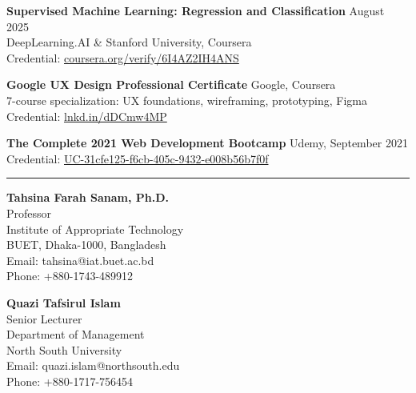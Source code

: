 \documentclass[11pt,a4paper]{article}
\renewcommand{\section}[1]{%
    \par\vspace{10pt}%
    \pagebreak[0]%
    \noindent{\large\bfseries\scshape #1}%
    \vspace{2pt}%
    \hrule%
    \vspace{6pt}%
    \nopagebreak[4]%
}
\begin{document}
\noindent\textbf{Supervised Machine Learning: Regression and Classification} \hfill August 2025\\
DeepLearning.AI \& Stanford University, Coursera\\
Credential: \href{https://coursera.org/verify/6I4AZ2IH4ANS}{coursera.org/verify/6I4AZ2IH4ANS}

\vspace{6pt}
\noindent\textbf{Google UX Design Professional Certificate} \hfill Google, Coursera\\
7-course specialization: UX foundations, wireframing, prototyping, Figma\\
Credential: \href{https://lnkd.in/dDCmw4MP}{lnkd.in/dDCmw4MP}

\vspace{6pt}
\noindent\textbf{The Complete 2021 Web Development Bootcamp} \hfill Udemy, September 2021\\
Credential: \href{https://www.udemy.com/certificate/UC-31cfe125-f6cb-405c-9432-e008b56b7f0f/}{UC-31cfe125-f6cb-405c-9432-e008b56b7f0f}

\section{References}

\noindent\begin{minipage}[t]{0.48\textwidth}
\textbf{Tahsina Farah Sanam, Ph.D.}\\
Professor\\
Institute of Appropriate Technology\\
BUET, Dhaka-1000, Bangladesh\\
Email: tahsina@iat.buet.ac.bd\\
Phone: +880-1743-489912
\end{minipage}
\hfill
\begin{minipage}[t]{0.48\textwidth}
\textbf{Quazi Tafsirul Islam}\\
Senior Lecturer\\
Department of Management\\
North South University\\
Email: quazi.islam@northsouth.edu\\
Phone: +880-1717-756454
\end{minipage}
\end{document}
